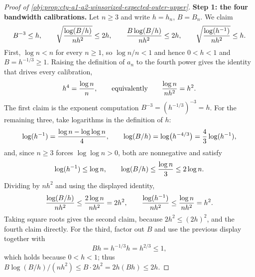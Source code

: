 \documentclass[11pt]{article}
\begin{document}
\begin{proof}[Proof of \cref{obj:prop:cty-a1-a2-winsorized-expected-outer-upper}]
\textbf{Step 1: the four bandwidth calibrations.}  Let \(n\geq3\) and write \(h=h_n\), \(B=B_n\).  We claim
\[
B^{-3}\leq h,
\qquad
\sqrt{\log(B/h)\over nh^2}\leq2h,
\qquad
{B\log(B/h)\over nh^2}\leq2h,
\qquad
\sqrt{\log(h^{-1})\over nh^2}\leq h .
\]
First, \(\log n<n\) for every \(n\geq1\), so \(\log n/n<1\) and hence \(0<h<1\) and \(B=h^{-1/3}\geq1\).  Raising the definition of \(a_n\) to the fourth power gives the identity that drives every calibration,
\[
h^4={\log n\over n},
\qquad\text{equivalently}\qquad
{\log n\over nh^2}=h^2 .
\]
The first claim is the exponent computation \(B^{-3}=(h^{-1/3})^{-3}=h\).
For the remaining three, take logarithms in the definition of \(h\):
\[
\log(h^{-1})={\log n-\log\log n\over4},
\qquad
\log(B/h)=\log\bigl(h^{-4/3}\bigr)={4\over3}\log(h^{-1}),
\]
and, since \(n\geq3\) forces \(\log\log n>0\), both are nonnegative and satisfy
\[
\log(h^{-1})\leq\log n,
\qquad
\log(B/h)\leq{\log n\over3}\leq2\log n .
\]
Dividing by \(nh^2\) and using the displayed identity,
\[
{\log(B/h)\over nh^2}\leq{2\log n\over nh^2}=2h^2,
\qquad
{\log(h^{-1})\over nh^2}\leq{\log n\over nh^2}=h^2 .
\]
Taking square roots gives the second claim, because \(2h^2\leq(2h)^2\), and the fourth claim directly.  For the third, factor out \(B\) and use the previous display together with
\[
Bh=h^{-1/3}h=h^{2/3}\leq1 ,
\]
which holds because \(0<h<1\); thus \(B\log(B/h)/(nh^2)\leq B\cdot2h^2=2h(Bh)\leq2h\).


\end{proof}
\end{document}
